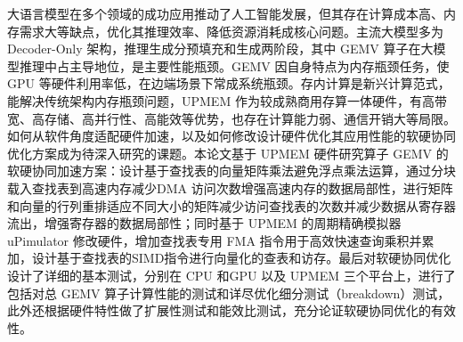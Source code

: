 \begin{abstractzh}
大语言模型在多个领域的成功应用推动了人工智能发展，但其存在计算成本高、内存需求大等缺点，优化其推理效率、降低资源消耗成核心问题。主流大模型多为Decoder-Only 架构，推理生成分预填充和生成两阶段，其中 GEMV 算子在大模型推理中占主导地位，是主要性能瓶颈。GEMV 因自身特点为内存瓶颈任务，使 GPU 等硬件利用率低，在边端场景下常成系统瓶颈。存内计算是新兴计算范式，能解决传统架构内存瓶颈问题，UPMEM 作为较成熟商用存算一体硬件，有高带宽、高存储、高并行性、高能效等优势，也存在计算能力弱、通信开销大等局限。如何从软件角度适配硬件加速，以及如何修改设计硬件优化其应用性能的软硬协同优化方案成为待深入研究的课题。本论文基于 UPMEM 硬件研究算子 GEMV 的软硬协同加速方案：设计基于查找表的向量矩阵乘法避免浮点乘法运算，通过分块载入查找表到高速内存减少DMA 访问次数增强高速内存的数据局部性，进行矩阵和向量的行列重排适应不同大小的矩阵减少访问查找表的次数并减少数据从寄存器流出，增强寄存器的数据局部性；同时基于 UPMEM 的周期精确模拟器 uPimulator 修改硬件，增加查找表专用 FMA 指令用于高效快速查询乘积并累加，设计基于查找表的SIMD指令进行向量化的查表和访存。最后对软硬协同优化设计了详细的基本测试，分别在 CPU 和GPU 以及 UPMEM 三个平台上，进行了包括对总 GEMV 算子计算性能的测试和详尽优化细分测试（breakdown）测试，此外还根据硬件特性做了扩展性测试和能效比测试，充分论证软硬协同优化的有效性。
\end{abstractzh}